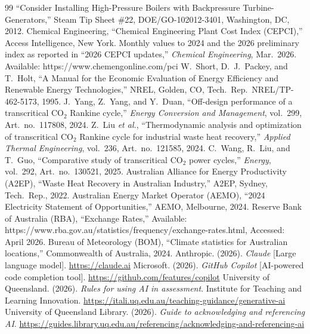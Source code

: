 \documentclass[12pt,a4paper]{report}
\begin{document}
\begin{thebibliography}{99}
``Consider Installing High-Pressure Boilers with Backpressure Turbine-Generators,''
Steam Tip Sheet \#22, DOE/GO-102012-3401, Washington, DC, 2012.
Chemical Engineering,
``Chemical Engineering Plant Cost Index (CEPCI),''
Access Intelligence, New York. Monthly values to 2024 and the 2026
preliminary index as reported in ``2026 CEPCI updates,'' \textit{Chemical
Engineering}, Mar.\ 2026. Available: https://www.chemengonline.com/pci
W.~Short, D.~J.~Packey, and T.~Holt,
``A Manual for the Economic Evaluation of Energy Efficiency and Renewable
Energy Technologies,''
NREL, Golden, CO, Tech.\ Rep.\ NREL/TP-462-5173, 1995.
J.~Yang, Z.~Yang, and Y.~Duan,
``Off-design performance of a transcritical CO$_2$ Rankine cycle,''
\textit{Energy Conversion and Management}, vol.~299, Art.\ no.~117808, 2024.
Z.~Liu \textit{et al.},
``Thermodynamic analysis and optimization of transcritical CO$_2$ Rankine
cycle for industrial waste heat recovery,''
\textit{Applied Thermal Engineering}, vol.~236, Art.\ no.~121585, 2024.
C.~Wang, R.~Liu, and T.~Guo,
``Comparative study of transcritical CO$_2$ power cycles,''
\textit{Energy}, vol.~292, Art.\ no.~130521, 2025.
Australian Alliance for Energy Productivity (A2EP),
``Waste Heat Recovery in Australian Industry,''
A2EP, Sydney, Tech.\ Rep., 2022.
Australian Energy Market Operator (AEMO),
``2024 Electricity Statement of Opportunities,''
AEMO, Melbourne, 2024.
Reserve Bank of Australia (RBA),
``Exchange Rates,'' Available: https://www.rba.gov.au/statistics/frequency/exchange-rates.html,
Accessed: April 2026.
Bureau of Meteorology (BOM),
``Climate statistics for Australian locations,''
Commonwealth of Australia, 2024.
Anthropic. (2026). \textit{Claude} [Large language model].
\url{https://claude.ai}
Microsoft. (2026). \textit{GitHub Copilot}
[AI-powered code completion tool].
\url{https://github.com/features/copilot}
University of Queensland. (2026).
\textit{Rules for using AI in assessment}.
Institute for Teaching and Learning Innovation.
\url{https://itali.uq.edu.au/teaching-guidance/generative-ai}
University of Queensland Library. (2026).
\textit{Guide to acknowledging and referencing AI}.
\url{https://guides.library.uq.edu.au/referencing/acknowledging-and-referencing-ai}
\end{thebibliography}
\appendix
\end{document}
